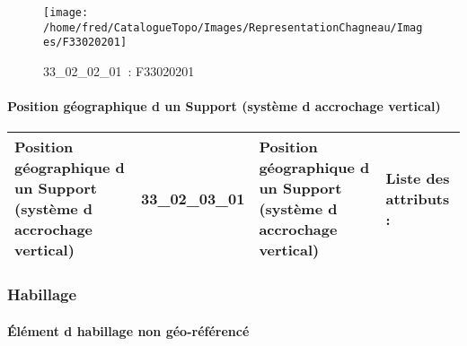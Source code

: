 \documentclass[12pt,titlepage,oneside]{book}
\begin{document}
\begin{figure}[h!]
  \hfill         %
  \begin{minipage}[t]{3cm}
    \begin{center}
      \texttt{[image: /home/fred/CatalogueTopo/Images/RepresentationChagneau/Images/F33020201]}
      \caption[~33\_02\_02\_01]{\small{33\_02\_02\_01~:} \tiny{F33020201}}\label{F33020201}
    \end{center}
  \end{minipage}
\end{figure}


\paragraph{Position géographique d un Support (système d accrochage vertical)}
\noindent
\vspace{\baselineskip}

\renewcommand{\arraystretch}{1.2}
\begin{supertabular}{|p{10cm}|c|p{13cm}|p{12cm}|}
 Position géographique d un Support (système d accrochage vertical) & 33\_02\_03\_01 & Position géographique d un Support (système d accrochage vertical) & Liste des attributs :
\begin{enumerate}
\end{enumerate}
\\
\hline
\end{supertabular}
\begin{figure}[h!]
  \hfill         %
\end{figure}

\subsubsection{\large Habillage}
\paragraph{Élément d habillage non géo-référencé}
\noindent
\vspace{\baselineskip}
\end{document}
